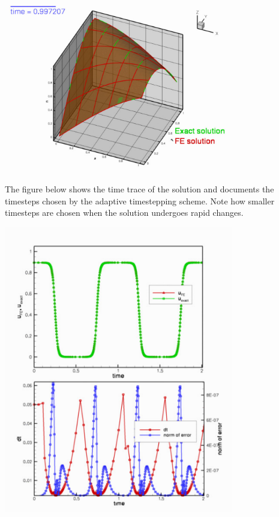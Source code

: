  
\begin{DoxyImage}
\includegraphics[width=0.75\textwidth]{unsteady_heat_soln}
\end{DoxyImage}


The figure below shows the time trace of the solution and documents the timesteps chosen by the adaptive timestepping scheme. Note how smaller timesteps are chosen when the solution undergoes rapid changes.

 
\begin{DoxyImage}
\includegraphics[width=0.75\textwidth]{trace}
\end{DoxyImage}


